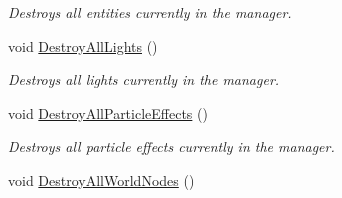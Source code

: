 \begin{DoxyCompactItemize}
\begin{DoxyCompactList}\small\item\em Destroys all entities currently in the manager. \item\end{DoxyCompactList}\item 
\hypertarget{classMezzanine_1_1SceneManager_a4dbe2f8c34aef587c263dd99a6d65e61}{
void \hyperlink{classMezzanine_1_1SceneManager_a4dbe2f8c34aef587c263dd99a6d65e61}{DestroyAllLights} ()}
\label{classMezzanine_1_1SceneManager_a4dbe2f8c34aef587c263dd99a6d65e61}

\begin{DoxyCompactList}\small\item\em Destroys all lights currently in the manager. \item\end{DoxyCompactList}\item 
\hypertarget{classMezzanine_1_1SceneManager_a4c54c954577f43a57c5164a0fb7e31cc}{
void \hyperlink{classMezzanine_1_1SceneManager_a4c54c954577f43a57c5164a0fb7e31cc}{DestroyAllParticleEffects} ()}
\label{classMezzanine_1_1SceneManager_a4c54c954577f43a57c5164a0fb7e31cc}

\begin{DoxyCompactList}\small\item\em Destroys all particle effects currently in the manager. \item\end{DoxyCompactList}\item 
\hypertarget{classMezzanine_1_1SceneManager_af30ec6d5ad5260dd9eb986305afe9181}{
void \hyperlink{classMezzanine_1_1SceneManager_af30ec6d5ad5260dd9eb986305afe9181}{DestroyAllWorldNodes} ()}
\label{classMezzanine_1_1SceneManager_af30ec6d5ad5260dd9eb986305afe9181}


\end{DoxyCompactItemize}

